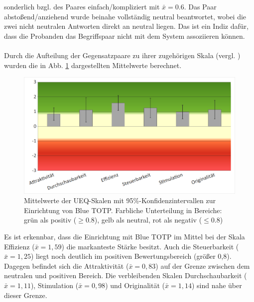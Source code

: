 sonderlich bzgl. des Paares \glqq einfach/kompliziert\grqq{} mit $\bar{x} = 0.6$.
Das Paar \glqq abstoßend/anziehend\grqq{} wurde beinahe vollständig 
neutral beantwortet, wobei die zwei nicht neutralen Antworten 
direkt an neutral liegen. Das ist ein Indiz dafür, dass die 
Probanden das Begriffspaar nicht mit dem System assoziieren 
können.
\\\\
Durch die Aufteilung der Gegensatzpaare zu ihrer zugehörigen 
Skala (vergl. \autocite[3]{Schrepp}) wurden die in Abb. 
\ref{fig: studie setup ueq overview} dargestellten Mittelwerte 
berechnet. 
\begin{figure}[h!]
    \centering
    \includegraphics[width=.75\linewidth]{data_processing/questionaires/results/figures_from_excel/setup_ueq_overview.png}
    \caption[Mittelwerte der UEQ-Skalen zur Einrichtung von Blue TOTP]{Mittelwerte der UEQ-Skalen mit 95\%-Konfidenzintervallen zur Einrichtung von Blue TOTP. Farbliche Unterteilung in Bereiche: grün als positiv ($\ge 0.8$), gelb als neutral, rot als negativ ($\le 0.8$)}
    \label{fig: studie setup ueq overview}
\end{figure}
Es ist erkennbar, dass die Einrichtung mit Blue TOTP im Mittel 
bei der Skala Effizienz ($\bar{x} = 1{,}59$) die markanteste Stärke 
besitzt. Auch die Steuerbarkeit ($\bar{x} = 1{,}25$) liegt noch 
deutlich im positiven Bewertungsbereich (größer 0{,}8). Dagegen 
befindet sich die Attraktivität ($\bar{x} = 0{,}83$) auf der Grenze 
zwischen dem neutralen und positiven Bereich. Die verbleibenden 
Skalen Durchschaubarkeit ($\bar{x} = 1{,}11$), Stimulation ($\bar{x} 
= 0{,}98$) und Originalität ($\bar{x} = 1{,}14$) sind nahe über dieser 
Grenze.
\newpage